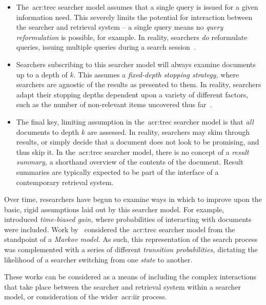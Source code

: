 \begin{itemize}
    \item{ The~\gls{acr:trec} searcher model assumes that a single query is issued for a given information need. This severely limits the potential for interaction between the searcher and retrieval system -- a single query means no \emph{query reformulation} is possible, for example. In reality, searchers \emph{do} reformulate queries, issuing multiple queries during a search session~\citep{keskustalo2009querying}.}
    \item{ Searchers subscribing to this searcher model will always examine documents up to a depth of $k$. This assumes a \emph{fixed-depth stopping strategy,} where searchers are agnostic of the results as presented to them. In reality, searchers adapt their stopping depths dependent upon a variety of different factors, such as the number of non-relevant items uncovered thus far~\citep{cooper1973retrieval_effectiveness_ii}.}
    \item{ The final key, limiting assumption in the~\gls{acr:trec} searcher model is that \emph{all} documents to depth $k$ are assessed. In reality, searchers may skim through results, or simply decide that a document does not look to be promising, and thus skip it. In the~\gls{acr:trec} searcher model, there is no concept of a \emph{result summary,} a shorthand overview of the contents of the document. Result summaries are typically expected to be part of the interface of a contemporary retrieval system.}
\end{itemize}

Over time, researchers have begun to examine ways in which to improve upon the basic, rigid assumptions laid out by this searcher model. For example,~\cite{smucker2012tbg} introduced \emph{time-biased gain,} where probabilities of interacting with documents were included. Work by~\cite{tran2017markov_models} considered the~\gls{acr:trec} searcher model from the standpoint of a \emph{Markov model.} As such, this representation of the search process was complemented with a series of different \emph{transition probabilities,} dictating the likelihood of a searcher switching from one \emph{state} to another.

These works can be considered as a means of including the complex interactions that take place between the searcher and retrieval system within a searcher model, or consideration of the wider~\gls{acr:iir} process.

